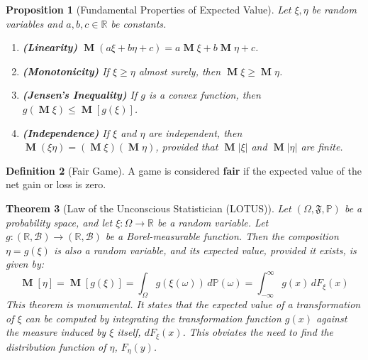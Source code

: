 \documentclass[12pt, openany]{book}
\theoremstyle{definition}
\newtheorem{definition}{Definition}[section]
\theoremstyle{plain}
\newtheorem{theorem}[definition]{Theorem}
\newtheorem{proposition}[definition]{Proposition}
\theoremstyle{remark}
\newcommand{\R}{\mathbb{R}}
\newcommand{\B}{\mathcal{B}}
\newcommand{\probP}{\mathbb{P}}
\newcommand{\germF}{\mathfrak{F}} %
\DeclareMathOperator{\E}{\mathbf{M}} %
\DeclareMathOperator{\M}{\mathbf{M}} %
\begin{document}
\begin{proposition}[Fundamental Properties of Expected Value]
Let $\xi, \eta$ be random variables and $a,b,c \in \R$ be constants.
\begin{enumerate}
    \item \textbf{(Linearity)} $\M(a\xi + b\eta + c) = a\M\xi + b\M\eta + c$.
    \item \textbf{(Monotonicity)} If $\xi \ge \eta$ almost surely, then $\M\xi \ge \M\eta$.
    \item \textbf{(Jensen's Inequality)} If $g$ is a convex function, then $g(\M\xi) \le \M[g(\xi)]$.
    \item \textbf{(Independence)} If $\xi$ and $\eta$ are independent, then $\M(\xi\eta) = (\M\xi)(\M\eta)$, provided that $\M|\xi|$ and $\M|\eta|$ are finite.
\end{enumerate}
\end{proposition}

\begin{definition}[Fair Game]
A game is considered \textbf{fair} if the expected value of the net gain or loss is zero.
\end{definition}

\begin{theorem}[Law of the Unconscious Statistician (LOTUS)]
Let $(\Omega, \germF, \probP)$ be a probability space, and let $\xi: \Omega \to \R$ be a random variable. Let $g: (\R, \B) \to (\R, \B)$ be a Borel-measurable function. Then the composition $\eta = g(\xi)$ is also a random variable, and its expected value, provided it exists, is given by:
$$ \E[\eta] = \E[g(\xi)] = \int_{\Omega} g(\xi(\omega)) \,d\probP(\omega) = \int_{-\infty}^{\infty} g(x) \,dF_\xi(x) $$
This theorem is monumental. It states that the expected value of a transformation of $\xi$ can be computed by integrating the transformation function $g(x)$ against the measure induced by $\xi$ itself, $dF_\xi(x)$. This obviates the need to find the distribution function of $\eta$, $F_\eta(y)$.
\end{theorem}
\end{document}
